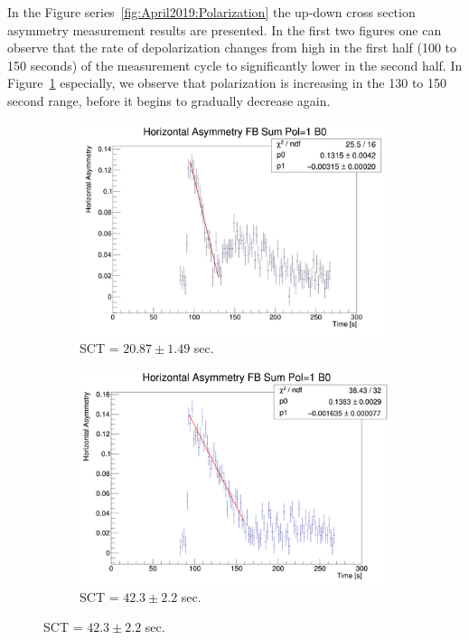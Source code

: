 In the Figure series~\ref{fig:April2019:Polarization} the up-down cross section asymmetry measurement 
results are presented. In the first two figures one can observe that the rate of depolarization changes from
high in the first half (100 to 150 seconds) of the measurement cycle to significantly lower in the second half.
In Figure~\ref{fig:Polariation:recovery-from-halo-to-core} especially, we observe that polarization is increasing in the 130 to 150 second range, before it begins to gradually decrease again.
\begin{figure}[h]\centering
	\begin{subfigure}{\linewidth}
		\includegraphics[height=.35\paperheight]{images/chapter4/SCT-April-2019/11th_19-55}
		\caption{SCT = $20.87 \pm 1.49$ sec.\label{fig:Polariation:recovery-from-halo-to-core}}
	\end{subfigure}
	\begin{subfigure}{\linewidth}
		\includegraphics[height=.35\paperheight]{images/chapter4/SCT-April-2019/11th_20-20}
		\caption{SCT = $42.3 \pm 2.2$ sec.}
	\end{subfigure}
\end{figure}
